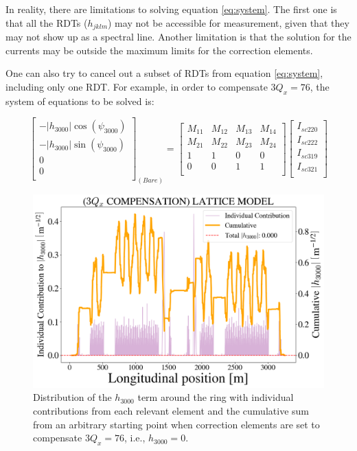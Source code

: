 In reality, there are limitations to solving equation \ref{eq:system}. The first one is that all the RDTs ($h_{jklm}$) may not be accessible for measurement, given that they may not show up as a spectral line.  Another limitation is that the solution for the currents may be outside the maximum limits for the correction elements. 

One can also try to cancel out a subset of RDTs from equation \ref{eq:system}, including only one RDT. For example, in order to compensate $3 Q_x=76$, the system of equations to be solved is:

\begin{equation}
    \begin{bmatrix}
        -|{h_{3000}}|  \cos (\psi_{3000})\\
        -|{h_{3000}}|  \sin (\psi_{3000})\\
        0\\
        0\\
      \end{bmatrix}_{(Bare)}
    =
    \begin{bmatrix}
        M_{11} & M_{12} & M_{13} & M_{14} \\
        M_{21} & M_{22} & M_{23} & M_{24} \\
        1 & 1 & 0 & 0 \\
        0 & 0 & 1 & 1 \\
    \end{bmatrix}
    \begin{bmatrix}
        I_{sc220} \\
        I_{sc222} \\
        I_{sc319} \\
        I_{sc321} \\
      \end{bmatrix}
    \label{eq:system1}
\end{equation}

\begin{figure}[H]
    \centering
    \includegraphics[width=\columnwidth]{chapter4/h3000_3qxcomp.png}
    \caption{Distribution of the $h_{3000}$ term around the ring with individual contributions from each relevant element and the cumulative sum from an arbitrary starting point when correction elements are set to compensate $3Q_x=76$, i.e., $h_{3000}=0$.}
    \label{fig:h3000_3qxcomp}
\end{figure}

